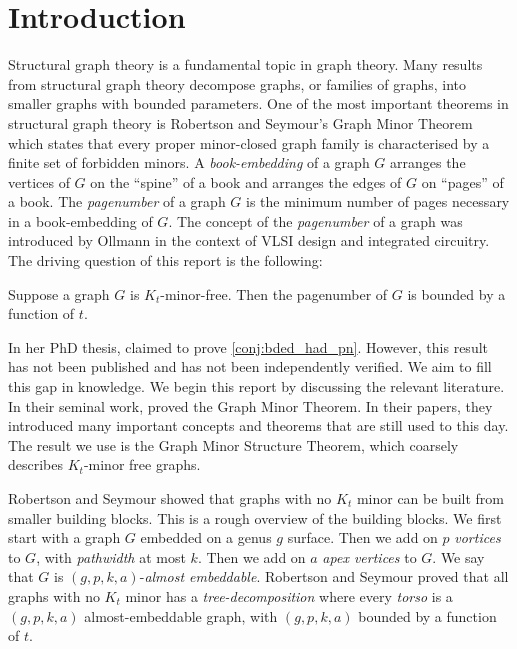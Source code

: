 \chapter{Introduction}\label{sec:introduction}
Structural graph theory is a fundamental topic in graph theory. Many results from structural graph theory decompose graphs, or families of graphs, into smaller graphs with bounded parameters. One of the most important theorems in structural graph theory is Robertson and Seymour's Graph Minor Theorem \cite{robertsonGraphMinorsXX2004} which states that every proper minor-closed graph family is characterised by a finite set of forbidden minors.
A \textit{book-embedding} of a graph $G$ arranges the vertices of $G$ on the ``spine'' of a book and arranges the edges of $G$ on ``pages'' of a book. The \textit{pagenumber} of a graph \(G\) is the minimum number of pages necessary in a book-embedding of \(G\). The concept of the \textit{pagenumber} of a graph was introduced by Ollmann \cite{ollmannBookThicknessVarious1973} in the context of VLSI design and integrated circuitry. 
The driving question of this report is the following:
\begin{conjecture}\label{conj:bded_had_pn}
	Suppose a graph $G$ is $K_t$-minor-free. Then the pagenumber of \(G\) is bounded by a function of \(t\).
\end{conjecture}
In her PhD thesis, \textcite{Blankenship-PhD03} claimed to prove \cref{conj:bded_had_pn}. However, this result has not been published and has not been independently verified. We aim to fill this gap in knowledge. 
We begin this report by discussing the relevant literature. In their seminal work, \textcite{robertsonGraphMinorsXVI2003} proved the Graph Minor Theorem. In their papers, they introduced many important concepts and theorems that are still used to this day. The result we use is the Graph Minor Structure Theorem, which coarsely describes $K_t$-minor free graphs.

Robertson and Seymour showed that graphs with no \(K_t\) minor can be built from smaller building blocks. This is a rough overview of the building blocks. We first start with a graph \(G\) embedded on a genus \(g\) surface. Then we add on \(p\) \textit{vortices} to \(G\), with \textit{pathwidth} at most \(k\). Then we add on \(a\) \textit{apex vertices} to \(G\). We say that \(G\) is \((g, p, k, a)\)-\textit{almost embeddable}. Robertson and Seymour \cite{robertsonGraphMinorsXVI2003} proved that all graphs with no \(K_t\) minor has a \textit{tree-decomposition} where every \textit{torso} is a \((g, p, k, a)\) almost-embeddable graph, with \((g, p, k, a)\) bounded by a function of \(t\).

